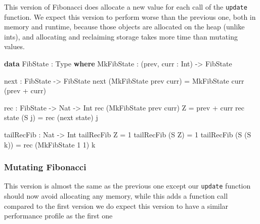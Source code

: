 \documentclass[
]{article}
\newenvironment{Shaded}{}{}
\newcommand{\DataTypeTok}[1]{\textcolor[rgb]{0.56,0.13,0.00}{#1}}
\newcommand{\DecValTok}[1]{\textcolor[rgb]{0.25,0.63,0.44}{#1}}
\newcommand{\KeywordTok}[1]{\textcolor[rgb]{0.00,0.44,0.13}{\textbf{#1}}}
\newcommand{\NormalTok}[1]{#1}
\newcommand{\OperatorTok}[1]{\textcolor[rgb]{0.40,0.40,0.40}{#1}}
\newcommand{\OtherTok}[1]{\textcolor[rgb]{0.00,0.44,0.13}{#1}}
\begin{document}
This version of Fibonacci does allocate a new value for each call of the
\texttt{update} function. We expect this version to perform worse than
the previous one, both in memory and runtime, because those objects are
allocated on the heap (unlike ints), and allocating and reclaiming
storage takes more time than mutating values.

\begin{Shaded}
\begin{Highlighting}[]
\KeywordTok{data} \DataTypeTok{FibState} \OperatorTok{:} \DataTypeTok{Type} \KeywordTok{where}
  \DataTypeTok{MkFibState} \OperatorTok{:}\NormalTok{ (prev, curr }\OperatorTok{:}  \DataTypeTok{Int}\NormalTok{) }\OtherTok{{-}\textgreater{}} \DataTypeTok{FibState}

\NormalTok{next }\OperatorTok{:} \DataTypeTok{FibState} \OtherTok{{-}\textgreater{}} \DataTypeTok{FibState}
\NormalTok{next (}\DataTypeTok{MkFibState}\NormalTok{ prev curr) }\OtherTok{=} \DataTypeTok{MkFibState}\NormalTok{ curr (prev }\OperatorTok{+}\NormalTok{ curr)}

\NormalTok{rec }\OperatorTok{:} \DataTypeTok{FibState} \OtherTok{{-}\textgreater{}} \DataTypeTok{Nat} \OtherTok{{-}\textgreater{}} \DataTypeTok{Int}
\NormalTok{rec (}\DataTypeTok{MkFibState}\NormalTok{ prev curr) }\DataTypeTok{Z} \OtherTok{=}\NormalTok{ prev }\OperatorTok{+}\NormalTok{ curr}
\NormalTok{rec state (}\DataTypeTok{S}\NormalTok{ j) }\OtherTok{=}\NormalTok{ rec (next state) j}

\NormalTok{tailRecFib }\OperatorTok{:} \DataTypeTok{Nat} \OtherTok{{-}\textgreater{}} \DataTypeTok{Int}
\NormalTok{tailRecFib }\DataTypeTok{Z} \OtherTok{=} \DecValTok{1}
\NormalTok{tailRecFib (}\DataTypeTok{S} \DataTypeTok{Z}\NormalTok{) }\OtherTok{=} \DecValTok{1}
\NormalTok{tailRecFib (}\DataTypeTok{S}\NormalTok{ (}\DataTypeTok{S}\NormalTok{ k)) }\OtherTok{=}\NormalTok{ rec (}\DataTypeTok{MkFibState} \DecValTok{1} \DecValTok{1}\NormalTok{) k}
\end{Highlighting}
\end{Shaded}

\hypertarget{mutating-fibonacci}{%
\subsubsection{Mutating Fibonacci}\label{mutating-fibonacci}}

This version is almost the same as the previous one except our
\texttt{update} function should now avoid allocating any memory, while
this adds a function call compared to the first version we do expect
this version to have a similar performance profile as the first one
\end{document}
